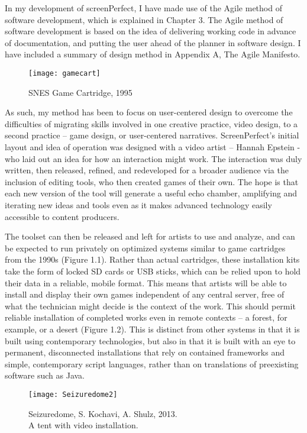 In my development of screenPerfect, I have made use of the Agile method of software development, which is explained in Chapter 3. The Agile method of software development is based on the idea of delivering working code in advance of documentation, and putting the user ahead of the planner in software design. I have included a summary of design method in Appendix A, The Agile Manifesto. 


\begin{figure}[!ht]
\centering
  \texttt{[image: gamecart]}
 \caption{SNES Game Cartridge, 1995}
\end{figure}

As such, my method has been to focus on user-centered design to overcome the difficulties of migrating skills involved in one creative practice, video design, to a second practice – game design, or user-centered narratives. ScreenPerfect's initial layout and idea of operation was designed with a video artist – Hannah Epstein - who laid out an idea for how an interaction might work. The interaction was duly written, then released, refined, and redeveloped for a broader audience via the inclusion of editing tools, who then created games of their own. The hope is that each new version of the tool will generate a useful echo chamber, amplifying and iterating new ideas and tools even as it makes advanced technology easily accessible to content producers.

The toolset can then be released and left for artists to use and analyze, and can be expected to run 
privately on optimized systems similar to game cartridges from the 1990s (Figure 1.1). Rather than actual cartridges, these installation kits take the form of locked SD cards or USB sticks, which can be relied upon to hold their data in a reliable, mobile format. This means that artists will be able to install and display their own games independent of any central server, free of what the technician might decide is the context of the work. This should permit reliable installation of completed works even in remote contexts – a forest, for example, or a desert (Figure 1.2). This is distinct from other systems in that it is built using contemporary technologies, but also in that it is built with an eye to permanent, disconnected installations that rely on contained frameworks and simple, contemporary script languages, rather than on translations of preexisting software such as Java.

\begin{figure}[!ht]
\centering
  \texttt{[image: Seizuredome2]}
 \caption{Seizuredome, S. Kochavi, A. Shulz, 2013.\\ A tent with video installation.}
\end{figure}


